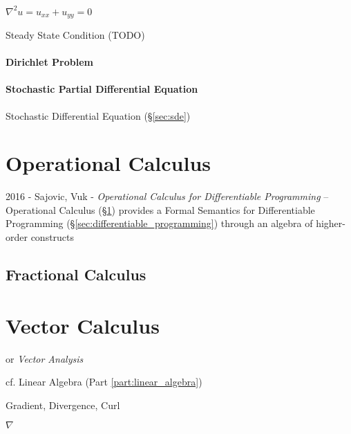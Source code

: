 $\nabla^2 u = u_{xx} + u_{yy} = 0$ %

Steady State Condition (TODO)



\paragraph{Dirichlet Problem}\label{sec:dirichlet_problem}\hfill

\paragraph{Stochastic Partial Differential Equation}\label{sec:spde}\hfill

\fist Stochastic Differential Equation (\S\ref{sec:sde})



\section{Operational Calculus}\label{sec:operational_calculus}

2016 - Sajovic, Vuk - \emph{Operational Calculus for Differentiable Programming}
-- Operational Calculus (\S\ref{sec:operational_calculus}) provides a Formal
Semantics for Differentiable Programming
(\S\ref{sec:differentiable_programming}) through an algebra of higher-order
constructs



\subsection{Fractional Calculus}\label{sec:fractional_calculus}



\section{Vector Calculus}\label{sec:vector_calculus}

or \emph{Vector Analysis}

\fist cf. Linear Algebra (Part \ref{part:linear_algebra})

Gradient, Divergence, Curl

$\nabla$

